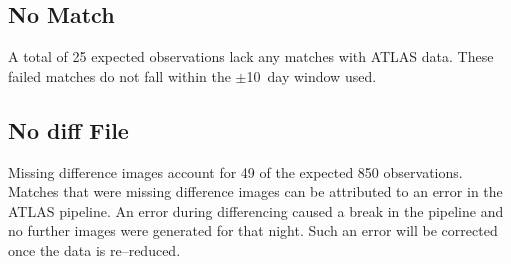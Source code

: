 \subsection{No Match}\label{sec:nomatch}
A total of 25 expected observations lack any matches with ATLAS data. These failed 
matches do not fall within the $\pm$10~day window used.


\subsection{No diff File}
\indent Missing difference images account for 49 of the expected 850 observations. 
Matches that were missing difference images can be attributed to an error in the 
ATLAS pipeline. An error during differencing caused a break in the pipeline and no 
further images were generated for that night. Such an error will be corrected once 
the data is re--reduced.


